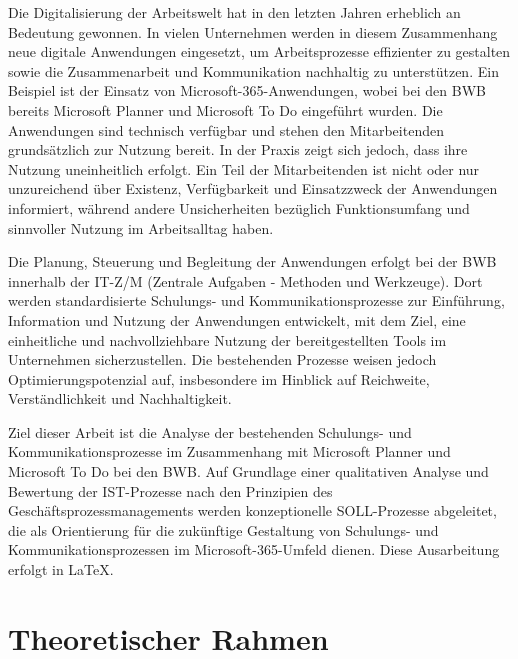 \documentclass[
    12pt, 
    a4paper,
    ]{scrartcl} %
\begin{document}
Die Digitalisierung der Arbeitswelt hat in den letzten Jahren erheblich an Bedeutung gewonnen. In vielen Unternehmen werden in diesem Zusammenhang neue digitale Anwendungen eingesetzt, um Arbeitsprozesse effizienter zu gestalten sowie die Zusammenarbeit und Kommunikation nachhaltig zu unterstützen. Ein Beispiel ist der Einsatz von Microsoft-365-Anwendungen, wobei bei den BWB bereits Microsoft Planner und Microsoft To Do eingeführt wurden. Die Anwendungen sind technisch verfügbar und stehen den Mitarbeitenden grundsätzlich zur Nutzung bereit. In der Praxis zeigt sich jedoch, dass ihre Nutzung uneinheitlich erfolgt. Ein Teil der Mitarbeitenden ist nicht oder nur unzureichend über Existenz, Verfügbarkeit und Einsatzzweck der Anwendungen informiert, während andere Unsicherheiten bezüglich Funktionsumfang und sinnvoller Nutzung im Arbeitsalltag haben.

Die Planung, Steuerung und Begleitung der Anwendungen erfolgt bei der BWB innerhalb der IT-Z/M (Zentrale Aufgaben - Methoden und Werkzeuge). Dort werden standardisierte Schulungs- und Kommunikationsprozesse zur Einführung, Information und Nutzung der Anwendungen entwickelt, mit dem Ziel, eine einheitliche und nachvollziehbare Nutzung der bereitgestellten Tools im Unternehmen sicherzustellen. Die bestehenden Prozesse weisen jedoch Optimierungspotenzial auf, insbesondere im Hinblick auf Reichweite, Verständlichkeit und Nachhaltigkeit.

Ziel dieser Arbeit ist die Analyse der bestehenden Schulungs- und Kommunikationsprozesse im Zusammenhang mit Microsoft Planner und Microsoft To Do bei den BWB. Auf Grundlage einer qualitativen Analyse und Bewertung der IST-Prozesse nach den Prinzipien des Geschäftsprozessmanagements werden konzeptionelle SOLL-Prozesse abgeleitet, die als Orientierung für die zukünftige Gestaltung von Schulungs- und Kommunikationsprozessen im Microsoft-365-Umfeld dienen. Diese Ausarbeitung erfolgt in LaTeX.

\section{Theoretischer Rahmen}
\end{document}
